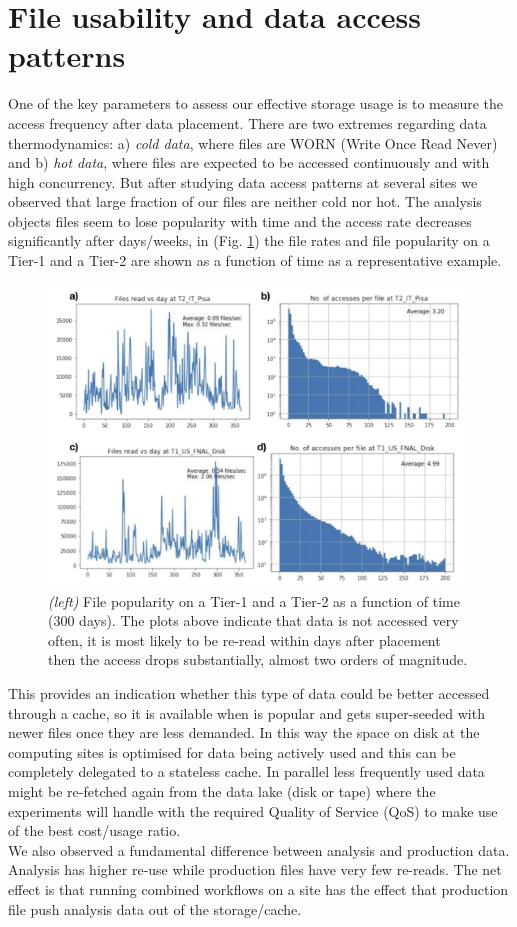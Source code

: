 \section{File usability and data access patterns}
One of the key parameters to assess our effective storage usage is to measure the access frequency after data placement. There are two extremes regarding data thermodynamics: a) \emph{cold data}, where files are WORN (Write Once Read Never) and b) \emph{hot data}, where files are expected to be accessed continuously and with high concurrency. But after studying data access patterns at several sites we observed that large fraction of our files are neither cold nor hot. The analysis objects files seem to lose popularity with time and the access rate decreases significantly after days/weeks, in (Fig. \ref{access}) the file rates and file popularity on a Tier-1 and a Tier-2 are shown as a function of time as a representative example.

\begin{figure}[h]
  \centering
  \includegraphics[height=8cm]{dataaccess-chep2019.png}
  \caption{{\em (left)} File popularity on a Tier-1 and a Tier-2 as a function of time (300 days). The plots above indicate that data is not accessed very often, it is most likely to be re-read within days after placement then the access drops substantially, almost two orders of magnitude.}
  \label{access}
\end{figure}

This provides an indication whether this type of data could be better accessed through a cache, so it is available when is popular and gets super-seeded with newer files once they are less demanded. In this way the space on disk at the computing sites is optimised for data being actively used and this can be completely delegated to a stateless cache. In parallel less frequently used data might be re-fetched again from the data lake (disk or tape) where the experiments will handle with the required Quality of Service (QoS) to make use of the best cost/usage ratio.\\
We also observed a fundamental difference between analysis and production data. Analysis has higher re-use while production files have very few re-reads. The net effect is that running combined workflows on a site has the effect that production file push analysis data out of the storage/cache.

